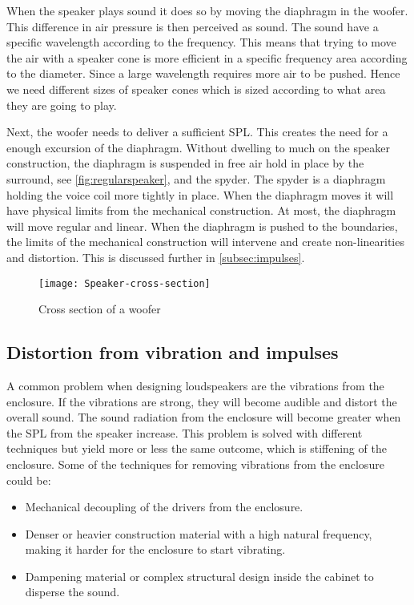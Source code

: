 When the speaker plays sound it does so by moving the diaphragm in the woofer. This difference in air pressure is then perceived as sound. The sound have a specific wavelength according to the frequency. This means that trying to move the air with a speaker cone is more efficient in a specific frequency area according to the diameter. %
Since a large wavelength requires more air to be pushed. Hence we need different sizes of speaker cones which is sized according to what area they are going to play.

Next, the woofer needs to deliver a sufficient \gls{SPL}. This creates the need for a enough excursion of the diaphragm. Without dwelling to much on the speaker construction, the diaphragm is suspended in free air hold in place by the surround, see \autoref{fig:regularspeaker}, and the spyder. The spyder is a diaphragm holding the voice coil more tightly in place. When the diaphragm moves it will have physical limits from the mechanical construction. At most, the diaphragm will move regular and linear. When the diaphragm is pushed to the boundaries, the limits of the mechanical construction will intervene and create non-linearities and distortion. This is discussed further in \autoref{subsec:impulses}.

\begin{figure}
\centering
\texttt{[image: Speaker-cross-section]}
\caption{Cross section of a woofer}
\label{fig:louderspeakerCrossSection}
\end{figure}



\subsection{Distortion from vibration and impulses}\label{subsec:impulses}

A common problem when designing loudspeakers are the vibrations from the enclosure. If the vibrations are strong, they will become audible and distort the overall sound. The sound radiation from the enclosure will become greater when the \gls{SPL} from the speaker increase. This problem is solved with different techniques but yield more or less the same outcome, which is stiffening of the enclosure. Some of the techniques for removing vibrations from the enclosure could be:
\begin{itemize}
\item Mechanical decoupling of the drivers from the enclosure.
\item Denser or heavier construction material with a high natural frequency, making it harder for the enclosure to start vibrating.
\item Dampening material or complex structural design inside the cabinet to disperse the sound.
\end{itemize}

